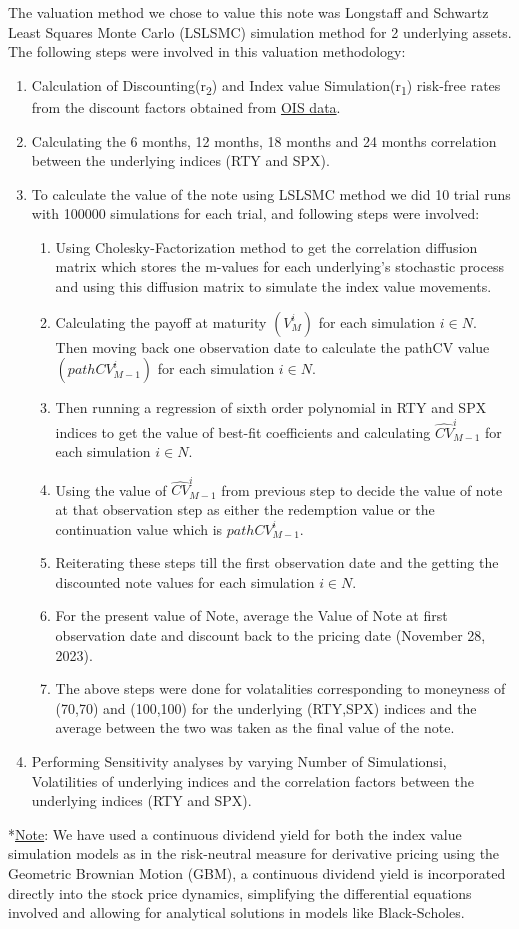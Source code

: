 \documentclass[12pt,a4paper]{article}
\begin{document}
The valuation method we chose to value this note was Longstaff and Schwartz Least Squares Monte Carlo (LSLSMC) simulation method for 2 underlying assets. The following steps were involved in this valuation methodology:
\begin{enumerate}
\item Calculation of Discounting(r\textsubscript{2}) and Index value Simulation(r\textsubscript{1}) risk-free rates from the discount factors obtained from \hyperref[app:ois]{OIS data}.
\item Calculating the 6 months, 12 months, 18 months and 24 months correlation between the underlying indices (RTY and SPX).
\item To calculate the value of the note using LSLSMC method we did 10 trial runs with 100000 simulations for each trial, and following steps were involved:
	\begin{enumerate}
	\item Using Cholesky-Factorization method to get the correlation diffusion matrix which stores the m-values for each underlying's stochastic process and using this diffusion matrix to simulate the index value movements.
	\item Calculating the payoff at maturity $(V^i_M)$ for each simulation $i \in N$. Then moving back one observation date to calculate the pathCV value $(pathCV^i_{M-1})$ for each simulation $i \in N$.
	\item Then running a regression of sixth order polynomial in RTY and SPX indices to get the value of best-fit coefficients and calculating $\hat{CV}^i_{M-1}$ for each simulation $i \in N$.
	\item Using the value of $\hat{CV}^i_{M-1}$ from previous step to decide the value of note at that observation step as either the redemption value or the continuation value which is $pathCV^i_{M-1}$.
	\item Reiterating these steps till the first observation date and the getting the discounted note values for each simulation $i \in N$.
	\item For the present value of Note, average the Value of Note at first observation date and discount back to the pricing date (November 28, 2023).
	\item The above steps were done for volatalities corresponding to moneyness of (70,70) and (100,100) for the underlying (RTY,SPX) indices and the average between the two was taken as the final value of the note.
	\end{enumerate}
\item Performing Sensitivity analyses by varying Number of Simulationsi, Volatilities of underlying indices and the correlation factors between the underlying indices (RTY and SPX).
\end{enumerate}
*\underline{Note}:  We have used a continuous dividend yield for both the index value simulation models as in the risk-neutral measure for derivative pricing using the Geometric Brownian Motion (GBM), a continuous dividend yield is incorporated directly into the stock price dynamics, simplifying the differential equations involved and allowing for analytical solutions in models like Black-Scholes.
\end{document}
